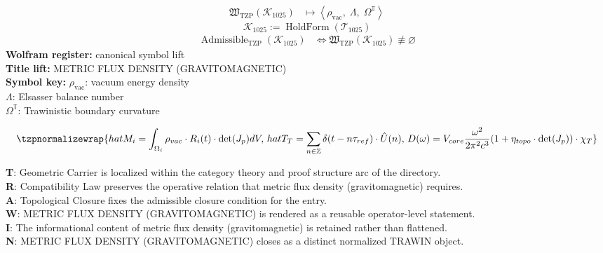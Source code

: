 \noindent
\begin{minipage}[t]{0.48\linewidth}
\begingroup
\small
\[
\begin{aligned}
\mathfrak{W}_{\mathrm{TZP}}\!\left(\mathcal{K}_{1025}\right)
&\longmapsto
\left\langle \rho_{\mathrm{vac}},\; \Lambda,\; \Omega^{\mathbb{T}} \right\rangle
\end{aligned}
\]
\[
\mathcal{K}_{1025}
:=
\operatorname{HoldForm}\!\left(\mathcal{T}_{1025}\right)
\]
\[
\begin{aligned}
\operatorname{Admissible}_{\mathrm{TZP}}\!\left(\mathcal{K}_{1025}\right)
&\Longleftrightarrow
\mathfrak{W}_{\mathrm{TZP}}\!\left(\mathcal{K}_{1025}\right)\not\equiv\varnothing
\end{aligned}
\]
\textbf{Wolfram register:} canonical symbol lift\\
\textbf{Title lift:} METRIC FLUX DENSITY (GRAVITOMAGNETIC)\\
\textbf{Symbol key:} \(\rho_{\mathrm{vac}}\): vacuum energy density\\ \(\Lambda\): Elsasser balance number\\ \(\Omega^{\mathbb{T}}\): Trawinistic boundary curvature
\par
\endgroup
\end{minipage}\hfill
\begin{minipage}[t]{0.48\linewidth}
\[
\tzpnormalizewrap{hat{M}_i = \int_{\Omega_i} \rho_{vac} \cdot R_i(t) \cdot \det(J_p) dV,\,hat{T}_T = \sum_{n \in \mathbb{Z}} \delta(t - n\tau_{ref}) \cdot \hat{U}(n),\,D(\omega) = V_{core} \frac{\omega^2}{2\pi^2 c^3} (1 + \eta_{topo} \cdot \det(J_p)) \cdot \chi_T}
\]

\small
\textbf{T}: Geometric Carrier is localized within the category theory and proof structure arc of the directory.\\
\textbf{R}: Compatibility Law preserves the operative relation that metric flux density (gravitomagnetic) requires.\\
\textbf{A}: Topological Closure fixes the admissible closure condition for the entry.\\
\textbf{W}: METRIC FLUX DENSITY (GRAVITOMAGNETIC) is rendered as a reusable operator-level statement.\\
\textbf{I}: The informational content of metric flux density (gravitomagnetic) is retained rather than flattened.\\
\textbf{N}: METRIC FLUX DENSITY (GRAVITOMAGNETIC) closes as a distinct normalized TRAWIN object.
\normalsize
\end{minipage}

